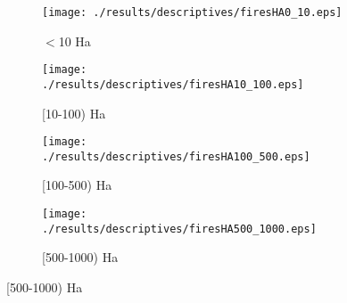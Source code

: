 \documentclass[11pt]{article}
\begin{document}
\begin{spacing}{1.3}

\begin{figure}[htpb!]
    \centering
    \caption{Wildfire Exposures by Magnitude of Fire}
    \label{fig:descfires}
    \begin{subfigure}{0.45\textwidth}
          \texttt{[image: ./results/descriptives/firesHA0\_10.eps]}
         \caption{$<$10 Ha}
    \end{subfigure}
    \begin{subfigure}{0.45\textwidth}
          \texttt{[image: ./results/descriptives/firesHA10\_100.eps]}
         \caption{[10-100) Ha}
    \end{subfigure}

    \begin{subfigure}{0.45\textwidth}
          \texttt{[image: ./results/descriptives/firesHA100\_500.eps]}
         \caption{[100-500) Ha}
    \end{subfigure}
    \begin{subfigure}{0.45\textwidth}
          \texttt{[image: ./results/descriptives/firesHA500\_1000.eps]}
         \caption{[500-1000) Ha}
    \end{subfigure}
\end{figure}






\end{spacing}
\end{document}
